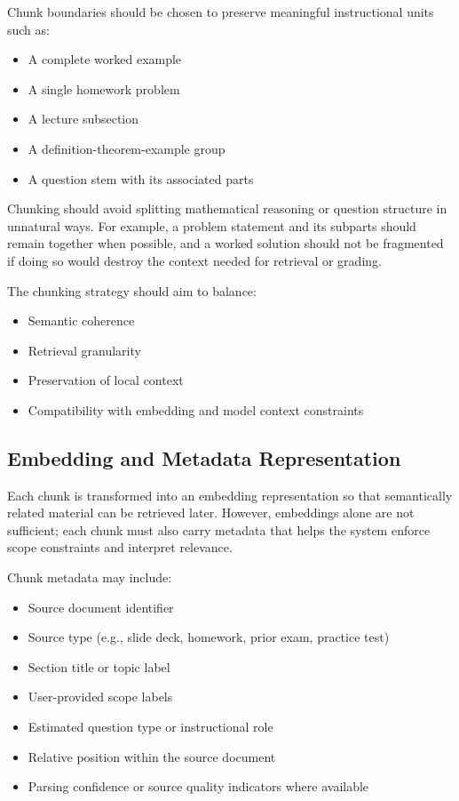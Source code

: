\documentclass[11pt]{article}
\begin{document}
Chunk boundaries should be chosen to preserve meaningful instructional units such as:
\begin{itemize}
\item A complete worked example
\item A single homework problem
\item A lecture subsection
\item A definition-theorem-example group
\item A question stem with its associated parts
\end{itemize}

Chunking should avoid splitting mathematical reasoning or question structure in unnatural ways. For example, a problem statement and its subparts should remain together when possible, and a worked solution should not be fragmented if doing so would destroy the context needed for retrieval or grading.

The chunking strategy should aim to balance:
\begin{itemize}
\item Semantic coherence
\item Retrieval granularity
\item Preservation of local context
\item Compatibility with embedding and model context constraints
\end{itemize}

\subsection{Embedding and Metadata Representation}
Each chunk is transformed into an embedding representation so that semantically related material can be retrieved later. However, embeddings alone are not sufficient; each chunk must also carry metadata that helps the system enforce scope constraints and interpret relevance.

Chunk metadata may include:
\begin{itemize}
\item Source document identifier
\item Source type (e.g., slide deck, homework, prior exam, practice test)
\item Section title or topic label
\item User-provided scope labels
\item Estimated question type or instructional role
\item Relative position within the source document
\item Parsing confidence or source quality indicators where available
\end{itemize}
\end{document}
